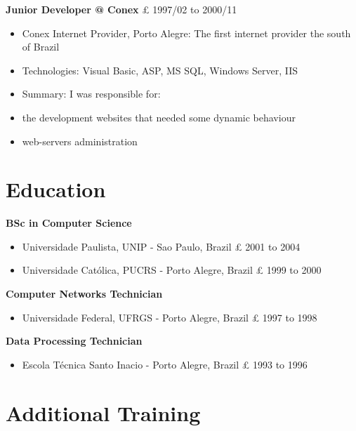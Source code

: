 \documentclass[margin,a4paper]{res}
\begin{document}
{\textbf{Junior Developer @ Conex} £ 1997/02 to 2000/11

\begin{itemize}
\itemsep1pt\parskip0pt
\item
  Conex Internet Provider, Porto Alegre: The first internet provider the
  south of Brazil
\item
  Technologies: Visual Basic, ASP, MS SQL, Windows Server, IIS
\item
  Summary: I was responsible for:
\item
  the development websites that needed some dynamic behaviour
\item
  web-servers administration
\end{itemize}

\section{Education}\label{education}

\textbf{BSc in Computer Science}

\begin{itemize}
\itemsep1pt\parskip0pt
\item
  Universidade Paulista, UNIP - Sao Paulo, Brazil £ 2001 to 2004
\item
  Universidade Católica, PUCRS - Porto Alegre, Brazil £ 1999 to 2000
\end{itemize}

\textbf{Computer Networks Technician}

\begin{itemize}
\itemsep1pt\parskip0pt
\item
  Universidade Federal, UFRGS - Porto Alegre, Brazil £ 1997 to 1998
\end{itemize}

\textbf{Data Processing Technician}

\begin{itemize}
\itemsep1pt\parskip0pt
\item
  Escola Técnica Santo Inacio - Porto Alegre, Brazil £ 1993 to 1996
\end{itemize}

\section{Additional Training}\label{additional-training}

}
\end{document}
